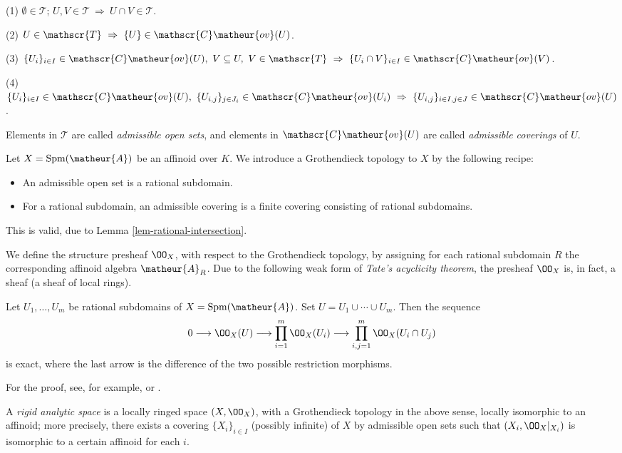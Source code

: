 \vspace{1ex}
(1) $\emptyset\in\mathscr{T}$; $U,V\in\mathscr{T}\ \Rightarrow\ 
U\cap V\in\mathscr{T}$.

(2) $U\in\mathscr{T}\ \Rightarrow\ \{U\}\in\mathscr{C}\matheur{ov}(U)$.

(3) $\{U_i\}_{i\in I}\in\mathscr{C}\matheur{ov}(U),\ V\subseteq U,\ V\in
\mathscr{T}\ \Rightarrow\ \{U_i\cap V\}_{i\in I}\in
\mathscr{C}\matheur{ov}(V)$.

(4) $\{U_i\}_{i\in I}\in\mathscr{C}\matheur{ov}(U),\ \{U_{i,j}\}_{j\in J_i}
\in\mathscr{C}\matheur{ov}(U_i)\ \Rightarrow\ \{U_{i,j}\}_{i\in I,j\in J}
\in\mathscr{C}\matheur{ov}(U)$.

\vspace{1ex}
Elements in $\mathscr{T}$ are called {\it admissible open sets}, and elements
in $\mathscr{C}\matheur{ov}(U)$ are called {\it admissible coverings} of $U$.

Let $X=\mathrm{Spm}(\matheur{A})$ be an affinoid over $K$.
We introduce a Grothendieck topology to $X$
by the following recipe:

\begin{itemize}
\item An admissible open set is a rational subdomain.
\item For a rational subdomain, an admissible covering is a finite 
covering consisting of rational subdomains.
\end{itemize}
This is valid, due to Lemma \ref{lem-rational-intersection}.

We define the structure presheaf $\OO_X$, with respect to the Grothendieck
topology, by assigning for each rational subdomain $R$ the corresponding
affinoid algebra $\matheur{A}_R$.
Due to the following weak form of {\it Tate's acyclicity theorem}, the
presheaf $\OO_X$ is, in fact, a sheaf (a sheaf of local rings).

\begin{appthm}
Let $U_1,\ldots,U_m$ be rational subdomains of
$X=\mathrm{Spm}(\matheur{A})$. Set $U=U_1\cup\cdots\cup U_m$.
Then the sequence
$$
0\longrightarrow\OO_X(U)\longrightarrow\prod^m_{i=1}\OO_X(U_i)
\longrightarrow\prod^m_{i,j=1}\OO_X(U_i\cap U_j)
$$
is exact, where the last arrow is the difference of the two possible
restriction morphisms.
\end{appthm}

For the proof, see, for example, \cite[8.2]{na} or \cite[III.2.2]{garea}.

\begin{appdfn}
A {\it rigid analytic space} is a locally ringed space $(X,\OO_X)$, with 
a Grothendieck topology in the above sense, locally isomorphic to an
affinoid;
more precisely, there exists a covering $\{X_i\}_{i\in I}$ 
(possibly infinite) of $X$ by 
admissible open sets such that $(X_i,\OO_X|_{X_i})$ is isomorphic to 
a certain affinoid for each $i$.
\end{appdfn}


